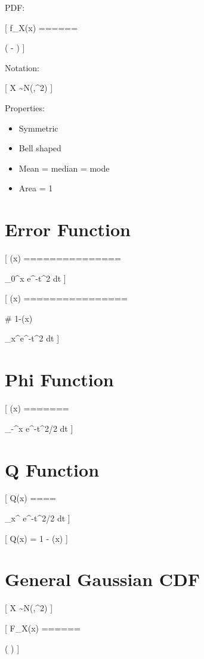 \documentclass[12pt]{article}
\begin{document}
PDF:

[
f_X(x)
======

\exp
\left(
-
\right)
]

Notation:

[
X \sim N(\mu,\sigma^2)
]

Properties:

\begin{itemize}
\item Symmetric
\item Bell shaped
\item Mean = median = mode
\item Area = 1
\end{itemize}

\section{Error Function}

[
(x)
===============

\int_0^x e^{-t^2} dt
]

[
(x)
================

# 1-(x)

\int_x^\infty e^{-t^2} dt
]

\section{Phi Function}

[
\Phi(x)
=======

\int_{-\infty}^x
e^{-t^2/2} dt
]

\section{Q Function}

[
Q(x)
====

\int_x^\infty
e^{-t^2/2} dt
]

[
Q(x) = 1 - \Phi(x)
]

\section{General Gaussian CDF}

[
X \sim N(\mu,\sigma^2)
]

[
F_X(x)
======

\Phi
\left(
\right)
]
\end{document}
